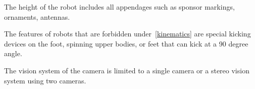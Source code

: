 \documentclass[12pt]{hurocup}
\begin{document}
\begin{decisions}
\item The height of the robot includes all appendages such as sponsor
  markings, ornaments, antennas.
  
\item The features of robots that are forbidden under~\ref{kinematics}
  are special kicking devices on the foot, spinning upper bodies, or
  feet that can kick at a 90 degree angle.

\item The vision system of the camera is limited to a single camera or
  a stereo vision system using two cameras.

\end{decisions}

\label{law:referee}
\end{document}
